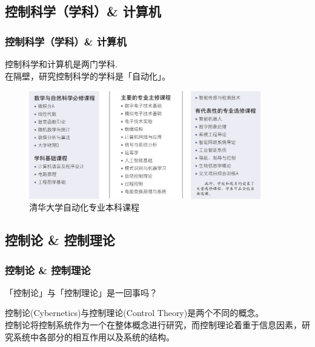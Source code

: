 \documentclass[12pt,AutoFakeBold,aspectratio=43,mathserif]{beamer}
\begin{document}
    \subsection{控制科学（学科）\& 计算机}
    \begin{frame}
        \frametitle{控制科学（学科）\& 计算机}
        \pause
        控制科学和计算机是两门学科. \\
        在隔壁，研究控制科学的学科是「自动化」。
        \begin{figure}[htbp]
            \caption{清华大学自动化专业本科课程}
            \setlength{\abovecaptionskip}{0.cm}
            \setlength{\belowcaptionskip}{-0.cm}
            \centering
            \vspace{-0.3cm}
            \setlength{\abovecaptionskip}{0.cm}
            \setlength{\belowcaptionskip}{-0.cm}
            \includegraphics[width=0.9\textwidth]{figures/3-1.jpg}
        \end{figure}
    \end{frame}
    \subsection{控制论 \& 控制理论}
    \begin{frame}
        \frametitle{控制论 \& 控制理论}
        \begin{block}{\textnormal{「控制论」与「控制理论」是一回事吗？}}
        \end{block} \pause
        控制论(Cybernetics)与控制理论(Control Theory)是两个不同的概念。 \\
        控制论将控制系统作为一个在整体概念进行研究，而控制理论着重于信息因素，研究系统中各部分的相互作用以及系统的结构。
        \pause
        
    
    \end{frame}
\end{document}
